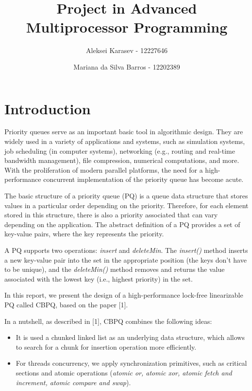 \documentclass{article}
\begin{document}
\title{Project in Advanced Multiprocessor Programming}
\author[1]{Aleksei Karasev - 12227646}
\author[2]{Mariana da Silva Barros - 12202389}
\maketitle

\section{Introduction}
Priority queues serve as an important basic tool in algorithmic design.
They are widely used in a variety of applications and systems, such as simulation systems, job scheduling (in computer systems), networking (e.g., routing and real-time bandwidth management), file compression, numerical computations, and more. With the proliferation of modern parallel platforms, the need for a high-performance concurrent implementation of the priority queue has become acute.\par

The basic structure of a priority queue (PQ) is a queue data structure that stores values in a particular order depending on the priority. Therefore, for each element stored in this structure, there is also a priority associated that can vary depending on the application. The abstract definition of a PQ provides a set of key-value pairs, where the key represents the priority.\par

A PQ supports two operations: \textit{insert} and \textit{deleteMin}. The \textit{insert()} method inserts a new key-value pair into the set in the appropriate position (the keys don't have to be unique), and the \textit{deleteMin()} method removes and returns the value associated with the lowest key (i.e., highest priority) in the set.\par

In this report, we present the design of a high-performance lock-free linearizable PQ called CBPQ, based on the paper [1].\par
In a nutshell, as described in [1], CBPQ combines the following ideas:

\begin{itemize}
  \item It is used a chunked linked list as an underlying data structure, which allows to search for a chunk for insertion operation more efficiently.
  \item For threads concurrency, we apply synchronization primitives, such as critical sections and atomic operations (\textit{atomic or, atomic xor, atomic fetch and increment, atomic compare and swap}).
\end{itemize}
\end{document}
